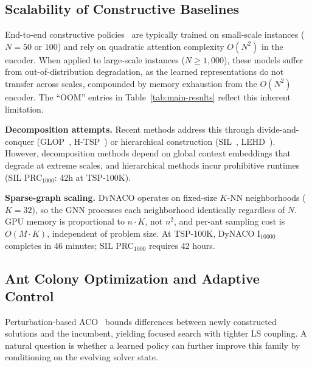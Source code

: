 \documentclass[sigconf,review]{acmart}
\newcommand{\DyNACO}{\textsc{DyNACO}}
\begin{document}
\subsection{Scalability of Constructive Baselines}
\label{app:constructive-limits}

End-to-end constructive policies~\cite{attentionmodel,pomo,bq,lehd, invit, sigd} are typically trained on small-scale instances ($N{=}50$ or $100$) and rely on quadratic attention complexity $O(N^2)$ in the encoder.
When applied to large-scale instances ($N{\geq}1{,}000$), these models suffer from out-of-distribution degradation, as the learned representations do not transfer across scales, compounded by memory exhaustion from the $O(N^2)$ encoder.
The ``OOM'' entries in Table~\ref{tab:main-results} reflect this inherent limitation.

\textbf{Decomposition attempts.}
Recent methods address this through divide-and-conquer (GLOP~\cite{glop}, H-TSP~\cite{htsp}) or hierarchical construction (SIL~\cite{sil}, LEHD~\cite{lehd}).
However, decomposition methods depend on global context embeddings that degrade at extreme scales, and hierarchical methods incur prohibitive runtimes (SIL PRC$_{1000}$: 42h at TSP-100K).

\textbf{Sparse-graph scaling.}
\DyNACO{} operates on fixed-size $K$-NN neighborhoods ($K{=}32$), so the GNN processes each neighborhood identically regardless of $N$.
GPU memory is proportional to $n \cdot K$, not $n^2$, and per-ant sampling cost is $O(M \cdot K)$, independent of problem size.
At TSP-100K, DyNACO I$_{10000}$ completes in 46 minutes; SIL PRC$_{1000}$ requires 42 hours.

\subsection{Ant Colony Optimization and Adaptive Control}
\label{app:aco-background}

Perturbation-based ACO~\cite{partialACO, P-ACO, faco} bounds differences between newly constructed solutions and the incumbent, yielding focused search with tighter LS coupling.
A natural question is whether a learned policy can further improve this family by conditioning on the evolving solver state.
\end{document}
